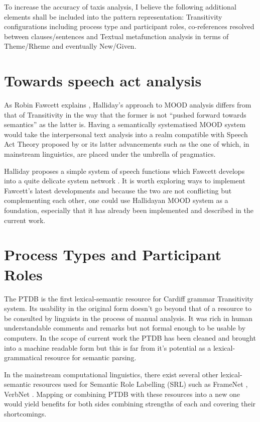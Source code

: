 To increase the accuracy of taxis analysis, I believe the following additional elements shall be included into the pattern representation: Transitivity configurations including process type and participant roles, co-references resolved between clauses/sentences and Textual metafunction analysis in terms of Theme/Rheme and eventually New/Given.

\section{Towards speech act analysis}
As Robin Fawcett explains \citep{Fawcett2011}, Halliday's approach to MOOD analysis differs from that of Transitivity in the way that the former is not ``pushed forward towards semantics'' as the latter is. Having a semantically systematised MOOD system would take the interpersonal text analysis into a realm compatible with Speech Act Theory proposed by \citet{Austin1975} or its latter advancements such as the one of \citet{Searle1969} which, in mainstream linguistics, are placed under the umbrella of pragmatics. 

Halliday proposes a simple system of speech functions \citep[p.136]{Halliday2013} which Fawcett develops into a quite delicate system network \citep{Fawcett2011}. It is worth exploring ways to implement Fawcett's latest developments and because the two are not conflicting but complementing each other, one could use Hallidayan MOOD system as a foundation, especially that it has already been implemented and described in the current work. 

\section{Process Types and Participant Roles}
The PTDB \citep{Neale2002} is the first lexical-semantic resource for Cardiff grammar Transitivity system. Its usability in the original form doesn't go beyond that of a resource to be consulted by linguists in the process of manual analysis. It was rich in human understandable comments and remarks but not formal enough to be usable by computers. In the scope of current work the PTDB has been cleaned and brought into a machine readable form but this is far from it's potential as a lexical-grammatical resource for semantic parsing. 

In the mainstream computational linguistics, there exist several other lexical-semantic resources used for Semantic Role Labelling (SRL) such as FrameNet \citep{Baker1998}, VerbNet \citep{Kipper2008}. Mapping or combining PTDB with these resources into a new one would yield benefits for both sides combining strengths of each and covering their shortcomings.

